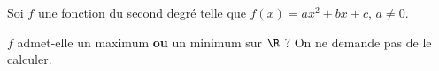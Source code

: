 
Soi $f$ une fonction du second degré telle que $f(x)=ax^2+bx+c$, $a \neq 0$.

$f$ admet-elle un maximum \textbf{ou} un minimum sur $\R$ ? On ne demande pas de le calculer.